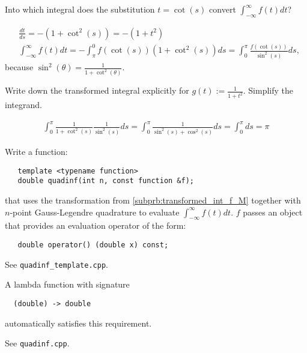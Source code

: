 \begin{problem}
 \begin{subproblem}[2]
  Into which integral does the substitution $t = \cot(s)$ convert $\int_{-\infty}^{\infty} f(t) dt$?
  \begin{solution}
  \begin{align}
   &\frac{dt}{ds} = - (1+\cot^2(s)) = -(1+t^2) \\
   & \int_{-\infty}^{\infty} f(t) dt = - \int_\pi^0 f(\cot(s)) (1+\cot^2(s)) ds = \int_0^\pi \frac{f(\cot(s))}{\sin^2(s)} ds,
  \end{align}
  because $\sin^2(\theta) = \frac{1}{1+\cot^2(\theta)}$.
  \end{solution}
 \end{subproblem}
 
 \begin{subproblem}[1] \label{subprb:transformed_int_f_M}
  Write down the transformed integral explicitly for $g(t) := \frac{1}{1+t^2}$. Simplify the integrand.
  \begin{solution}
  \begin{align}
   \int_0^\pi \frac{1}{1 + \cot^2(s)} \frac{1}{\sin^2(s)} ds = \int_0^\pi \frac{1}{\sin^2(s) + \cos^2(s)} ds = \int_0^\pi ds = \pi
  \end{align}
  \end{solution}
 \end{subproblem}

 \begin{subproblem}[2] \label{subprb:transformed_int_cpp_impl}
  Write a \Cpp{} function:
  \begin{lstlisting}
   template <typename function>
   double quadinf(int n, const function &f);
  \end{lstlisting}
  that uses the transformation from \ref{subprb:transformed_int_f_M} together with $n$-point Gauss-Legendre quadrature to evaluate $\int_{-\infty}^{\infty} f(t) dt$. $f$ passes an object that provides an evaluation operator of the form:
  \begin{lstlisting}
   double operator() (double x) const;
  \end{lstlisting}
  \begin{hint}
   See \verb|quadinf_template.cpp|.
  \end{hint}
  \begin{hint}
   A lambda function with signature
  \begin{lstlisting}
  (double) -> double
  \end{lstlisting}
  automatically satisfies this requirement.
  \end{hint}
\cprotEnv \begin{solution}
   See \verb|quadinf.cpp|.
  \end{solution}
 \end{subproblem}


\end{problem}
